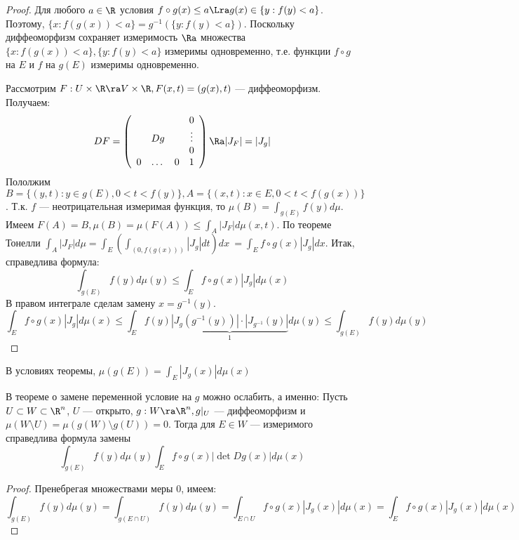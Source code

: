 \begin{proof}
    Для любого \(a \in \R\) условия \(f \circ g(x) \le a \Lra g(x) \in \{y: f(y) < a\}\). Поэтому, \(\{x: f(g(x)) < a\} = g^{-1}(\{y: f(y) < a\})\). Поскольку диффеоморфизм сохраняет измеримость \(\Ra\) множества \(\{x : f(g(x)) < a\}, \{y: f(y) < a\}\) измеримы одновременно, т.е. функции \(f \circ g\) на \(E\) и \(f\) на \(g(E)\) измеримы одновременно.

    Рассмотрим \(F: U \times \R \ra V \times \R, F(x, t) = (g(x), t)\) --- диффеоморфизм. Получаем:
    \[DF = \left(\begin{array}{cccc}
        & & & 0\\
        & Dg & & \vdots \\
        &  & & 0 \\
        0 & \dots & 0 & 1 \\

    \end{array}\right) \Ra |J_F| = |J_g|\]
    Пололжим \(B = \{(y, t): y \in g(E), 0 < t < f(y)\}, A = \{(x, t): x\in E, 0 < t < f(g(x))\}\). Т.к. \(f\) --- неотрицательная измеримая функция, то \(\mu(B) = \int_{g(E)} f(y)d\mu\). Имеем \(F(A) = B, \mu(B) = \mu(F(A)) \le \int_A |J_F|d\mu(x, t)\). По теореме Тонелли \(\int_A |J_F|d\mu = \int_E\left(\int_{(0, f(g(x)))} |J_g| dt\right)dx\ = \int_E f \circ g(x) |J_g|dx\). Итак, справедлива формула:
    \[\int_{g(E)} f(y)d\mu(y) \le \int_E f\circ g(x) |J_g|d\mu(x)\]
    В правом интеграле сделам замену \(x = g^{-1}(y)\).
    \[\int_E f\circ g(x) |J_g|d\mu(x) \le \int_{E} f(y) \underbrace{|J_g(g^{-1}(y))|\cdot|J_{g^{-1}}(y)|}_{1}d\mu(y)\le \int_{g(E)} f(y)d\mu(y)\]
\end{proof}

\begin{corollary}
    В условиях теоремы, \(\mu(g(E)) = \int_E |J_g(x)|d\mu(x)\)
\end{corollary}

\begin{note}
    В теореме о замене переменной условие на \(g\) можно ослабить, а именно: Пусть \(U \subset W \subset \R^n\), \(U\) --- открыто, \(g: W \ra \R^n, g|_{U}\) --- диффеоморфизм и \(\mu(W \setminus U) = \mu(g(W) \setminus g(U)) = 0\). Тогда для \(E \in W\) --- измеримого справедлива формула замены
    \[\int_{g(E)} f(y) d\mu(y) \int_E f \circ g(x) |\det Dg(x)|d\mu(x)\]
\end{note}
\begin{proof}
    Пренебрегая множествами меры \(0\), имеем: 
    \[\int_{g(E)} f(y) d\mu(y) = \int_{g(E \cap U)} f(y) d\mu(y) = \int_{E \cap U} f \circ g(x) |J_g(x)|d\mu(x) = \int_{E} f \circ g(x) |J_g(x)|d\mu(x)\]
\end{proof}

